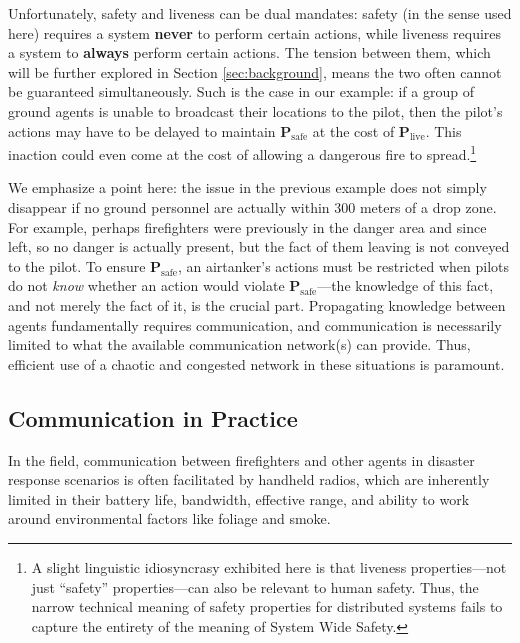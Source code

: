 \documentclass[]             %
{NASA}                       %
\theoremstyle{definition}
\begin{document}
Unfortunately, safety and liveness can be dual mandates: safety (in the
sense used here) requires a system \textbf{never} to perform certain
actions, while liveness requires a system to \textbf{always} perform
certain actions. The tension between them, which will be further
explored in Section \ref{sec:background}, means the two often cannot be
guaranteed simultaneously. Such is the case in our example: if a group
of ground agents is unable to broadcast their locations to the pilot,
then the pilot's actions may have to be delayed to maintain
\(\textbf{P}_\textrm{safe}\) at the cost of
\(\textbf{P}_\textrm{live}\). This inaction could even come at the cost
of allowing a dangerous fire to spread.\footnote{A slight linguistic
  idiosyncrasy exhibited here is that liveness properties---not just
  ``safety'' properties---can also be relevant to human safety. Thus,
  the narrow technical meaning of safety properties for distributed
  systems fails to capture the entirety of the meaning of System Wide
  Safety.}

We emphasize a point here: the issue in the previous example does not
simply disappear if no ground personnel are actually within 300 meters
of a drop zone. For example, perhaps firefighters were previously in the
danger area and since left, so no danger is actually present, but the
fact of them leaving is not conveyed to the pilot. To ensure
\(\textbf{P}_\textrm{safe}\), an airtanker's actions must be restricted
when pilots do not \emph{know} whether an action would violate
\(\textbf{P}_\textrm{safe}\)---the knowledge of this fact, and not
merely the fact of it, is the crucial part. Propagating knowledge
between agents fundamentally requires communication, and communication
is necessarily limited to what the available communication network(s)
can provide. Thus, efficient use of a chaotic and congested network in
these situations is paramount.

\hypertarget{communication-in-practice}{%
\subsection{Communication in Practice}\label{communication-in-practice}}

In the field, communication between firefighters and other agents in
disaster response scenarios is often facilitated by handheld radios,
which are inherently limited in their battery life, bandwidth, effective
range, and ability to work around environmental factors like foliage and
smoke.
\end{document}
